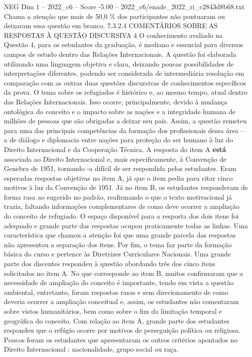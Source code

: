 \begin{textsample}{NEG Dim 1 – 2022\_c6 – Score -5.00 – 2022\_c6/enade\_2022\_ri\_c2843d8b68.txt}
Chama a atenção que mais de 50,0 \% dos participantes não pontuaram ou deixaram essa questão em branco. 7.3.2.4 COMENTÁRIOS SOBRE AS RESPOSTAS À QUESTÃO DISCURSIVA 4 O conhecimento avaliado na Questão 4, para os estudantes da graduação, é mediano e essencial para diversos campos de estudo dentro das Relações Internacionais.
A questão foi elaborada utilizando uma linguagem objetiva e clara, deixando poucas possibilidades de interpretações diferentes, podendo ser considerada de intermediária resolução em comparação com as outras duas questões discursivas de conhecimentos específicos da prova.
O tema sobre os refugiados é histórico e, ao mesmo tempo, atual dentro das Relações Internacionais.
Isso ocorre, principalmente, devido à mudança ontológica do conceito e o impacto sobre as nações e a integridade humana de milhões de pessoas que são obrigadas a deixar seu país.
Assim, a questão remeteu para uma das principais competências da formação dos profissionais dessa área – a de diálogo e diplomacia entre nações para proteção do ser humano à luz do Direito Internacional e da Cooperação Técnica.
A resposta do item A \textbf{está} associada ao Direito Internacional e, mais especificamente, à Convenção de Genebra de 1951, tornando -a difícil de ser respondida pelos estudantes.
Eram esperadas respostas objetivas no item A, já que o item pedia para citar cinco motivos à luz da Convenção de 1951.
Já no item B, os estudantes responderam de forma rasa ao sugerido no padrão, reafirmando o que o texto motivacional já trazia, faltando informações complementares de como deve ocorrer a ampliação do conceito de refugiado.
O espaço disponível para a resposta dos dois itens foi adequado e grande parte das respostas ocupou praticamente todas as linhas.
Uma característica que chamou a atenção foi que uma grande parcela das respostas não apresentou a separação dos itens.
Por fim, o tema faz parte da formação básica do curso e pertence às Diretrizes Curriculares Nacionais.
Uma grande parte dos discentes respondeu à questão abordando três dos cinco itens solicitados no item A.
No que corresponde ao item B, muitos confirmaram que a necessidade de ampliação do conceito é importante, tendo em vista a questão ambiental, entretanto, foram respostas rasas e sem direcionamento de como deveria ocorrer a ampliação conceitual e, assim, os estudantes não comentaram sobre vistos humanitários, bem como sobre o fim da limitação temporal e geográfica do conceito.
Com relação ao item A, grande parte dos estudantes respondeu que o refúgio ocorre por motivos de perseguição política ou religiosa.
Poucos foram os estudantes que apresentaram os outros critérios apontados no Direito Internacional : nacionalidade, grupo social ou raça.

\end{textsample}
